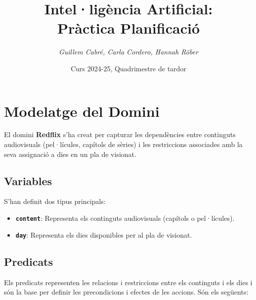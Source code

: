 \documentclass[a4paper]{article}
\title{\textbf{Intel·ligència Artificial:\\
		Pràctica Planificació}}
\author{\emph{Guillem Cabré, Carla Cordero, Hannah Röber}}
\date{Curs 2024-25, Quadrimestre de tardor}
\begin{document}
	
	\begin{titlepage}
		\clearpage\maketitle
		\thispagestyle{empty}
	\end{titlepage}
	
	\tableofcontents
	\clearpage
	
	
	\section{Modelatge del Domini}
	El domini \textbf{Redflix} s'ha creat per capturar les dependències entre continguts audiovisuals (pel·lícules, capítols de sèries) i les restriccions associades amb la seva assignació a dies en un pla de visionat.
	
	\subsection{Variables}
	S'han definit dos tipus principals:
	\begin{itemize}
		\item \textbf{\texttt{content}}: Representa els continguts audiovisuals (capítols o pel·lícules).
		\item \textbf{\texttt{day}}: Representa els dies disponibles per al pla de visionat.
	\end{itemize}
	
	\subsection{Predicats}
	Els predicats representen les relacions i restriccions entre els continguts i els dies i són la base per definir les precondicions i efectes de les accions. Són els següents:
	
\end{document}
